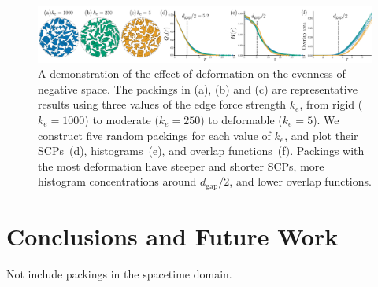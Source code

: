 \begin{figure}
\centering
\includegraphics[width=1.0\textwidth]{figures/metrics/evaluation.pdf}
\caption[A demonstration of the effect of deformation \newline on the evenness of negative space]
{\label{fifteen_packings}
    A demonstration of the effect of deformation on the evenness of negative space.  
    The packings in (a), (b) and (c) are representative results using three values of the edge force strength $k_e$,
    from 
	rigid ($k_e=1000$) to moderate ($k_e=250$) to deformable ($k_e=5$).
	We construct
    five random packings for each value of $k_e$, and plot their SCPs~(d), histograms~(e), and overlap functions~(f).
    Packings with the most deformation have steeper and shorter SCPs, 
    more histogram concentrations around $d_\mathrm{gap} / 2$, and lower overlap functions.
}
\end{figure}

\section{Conclusions and Future Work}

\mynote
{
Not include packings in the spacetime domain.
}